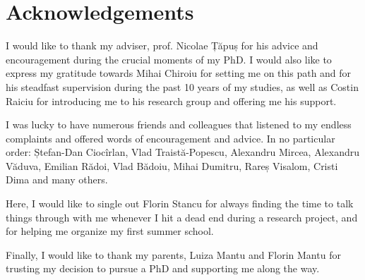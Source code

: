 \chapter*{Acknowledgements}
\thispagestyle{empty}

I would like to thank my adviser, prof. Nicolae Țăpuș for his advice and
encouragement during the crucial moments of my PhD. I would also like to express
my gratitude towards Mihai Chiroiu for setting me on this path and for his
steadfast supervision during the past 10 years of my studies, as well as Costin
Raiciu for introducing me to his research group and offering me his support.

I was lucky to have numerous friends and colleagues that listened to my endless
complaints and offered words of encouragement and advice. In no particular order:
Ștefan-Dan Ciocîrlan, Vlad Traistă-Popescu, Alexandru Mircea, Alexandru Văduva,
Emilian Rădoi, Vlad Bădoiu, Mihai Dumitru, Rareș Visalom, Cristi Dima and many
others.

Here, I would like to single out Florin Stancu for always finding the time to
talk things through with me whenever I hit a dead end during a research project,
and for helping me organize my first summer school.

Finally, I would like to thank my parents, Luiza Mantu and Florin Mantu for
trusting my decision to pursue a PhD and supporting me along the way.
